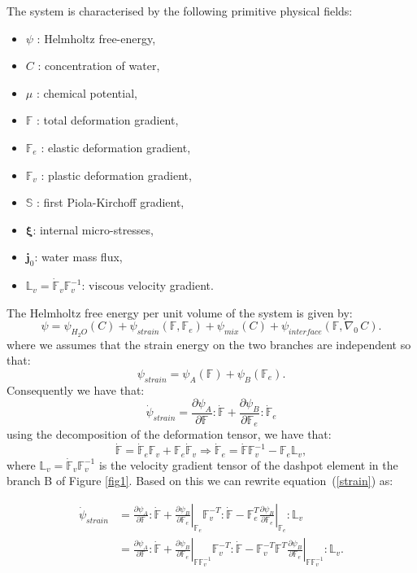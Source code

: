 \documentclass[12pt]{extarticle}
\newcommand{\F}{\ensuremath{\mathbb{F}}}
\newcommand{\LL}{\ensuremath{\mathbb{L}}}
\begin{document}
The system is characterised by the following primitive physical fields: 
\begin{itemize}
	\item $\psi$ : Helmholtz free-energy,
	\item $C$ : concentration of water,
	\item $\mu$ : chemical potential,
	\item $\F$ : total deformation gradient,
	\item $\F_e$ : elastic deformation gradient,
	\item $\F_v$ : plastic deformation gradient,
	\item $\mathbb{S}$ : first Piola-Kirchoff gradient,
	\item $\boldsymbol{\xi}$: internal micro-stresses,
	\item $\mathbf{j}_0$: water mass flux,
	\item $\LL_v=\dot{\F}_v\F^{-1}_v$: viscous velocity gradient.
\end{itemize} 

The Helmholtz free energy per unit volume of the system is given by:
\begin{equation}
\psi = \psi_{H_2O}(C) + \psi_{strain}(\F,\F_e) + \psi_{mix}(C) + \psi_{interface}(\F,\nabla_0 \, C).
\end{equation}
where we assumes that the strain energy on the two branches are independent so that:
\begin{equation}
\psi_{strain}=\psi_{A}(\F)+\psi_{B}(\F_e).
\label{strain}
\end{equation}
Consequently we have that:
\begin{equation}
\dot{\psi}_{strain}= \frac{\partial \psi_A}{\partial \F}:\dot{\F} +  \frac{\partial \psi_B}{\partial \F_e}:\dot{\F}_e
\end{equation}
using the decomposition of the deformation tensor, we have that:
\begin{equation}
\dot{\F}=\dot{\F}_e\F_v+\F_e\dot{\F}_v \Longrightarrow \dot{\F}_e=\dot{\F}\F_v^{-1}-\F_e \LL_v,
\end{equation}
where $\LL_v=\dot{\F}_v\F_v^{-1}$ is the velocity gradient tensor of the dashpot element in the branch B of Figure \ref{fig1}. Based on this we can rewrite equation~(\ref{strain}) as:

\begin{equation}
\begin{aligned}
\dot{\psi}_{strain} &= \frac{\partial \psi_A}{\partial \F}:\dot{\F} +  \left.\frac{\partial \psi_B}{\partial \F_e}\right|_{\F_e}\F_v^{-T}:\dot{\F}-\F_e^T\left.\frac{\partial \psi_B}{\partial \F_e}\right|_{\F_e}:\LL_v \\
&=  \frac{\partial \psi_A}{\partial \F}:\dot{\F} +  \left.\frac{\partial \psi_B}{\partial \F_e}\right|_{\F\F_v^{-1}}\F_v^{-T}:\dot{\F}-\F_v^{-T}\F^T\left.\frac{\partial \psi_B}{\partial \F_e}\right|_{\F\F_v^{-1}}:\LL_v.
\end{aligned}
\end{equation}
\end{document}
